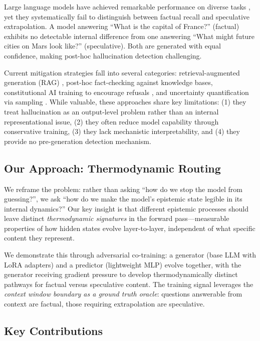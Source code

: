 \documentclass[11pt,a4paper]{article}
\begin{document}
Large language models have achieved remarkable performance on diverse tasks \citep{brown2020language, touvron2023llama, jiang2023mistral}, yet they systematically fail to distinguish between factual recall and speculative extrapolation. A model answering ``What is the capital of France?'' (factual) exhibits no detectable internal difference from one answering ``What might future cities on Mars look like?'' (speculative). Both are generated with equal confidence, making post-hoc hallucination detection challenging.

Current mitigation strategies fall into several categories: retrieval-augmented generation (RAG) \citep{lewis2020retrieval}, post-hoc fact-checking against knowledge bases, constitutional AI training to encourage refusals \citep{bai2022constitutional}, and uncertainty quantification via sampling \citep{kuhn2023semantic}. While valuable, these approaches share key limitations: (1) they treat hallucination as an output-level problem rather than an internal representational issue, (2) they often reduce model capability through conservative training, (3) they lack mechanistic interpretability, and (4) they provide no pre-generation detection mechanism.

\subsection{Our Approach: Thermodynamic Routing}

We reframe the problem: rather than asking ``how do we stop the model from guessing?'', we ask ``how do we make the model's epistemic state legible in its internal dynamics?'' Our key insight is that different epistemic processes should leave distinct \emph{thermodynamic signatures} in the forward pass---measurable properties of how hidden states evolve layer-to-layer, independent of what specific content they represent.

We demonstrate this through adversarial co-training: a generator (base LLM with LoRA adapters) and a predictor (lightweight MLP) evolve together, with the generator receiving gradient pressure to develop thermodynamically distinct pathways for factual versus speculative content. The training signal leverages the \emph{context window boundary as a ground truth oracle}: questions answerable from context are factual, those requiring extrapolation are speculative.

\subsection{Key Contributions}
\end{document}
